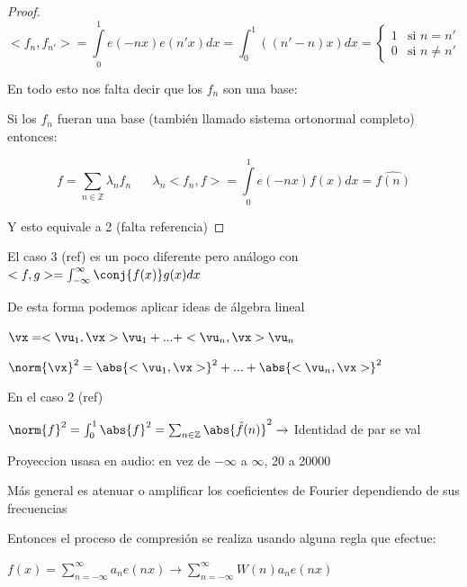 \begin{proof}

	$$< f_n, f_{n'}> = \int\limits^1_0 e(-nx) e(n'x) dx = \int^1_0 ((n' -n)x) dx =
	\begin{cases}
		1 & \mbox{si } n = n' \\
		0 & \mbox{si } n\neq n'
	\end{cases}$$

	En todo esto nos falta decir que los $f_n$ son una base:

	Si los $f_n$ fueran una base (también llamado sistema ortonormal completo) entonces:

	$$f = \sum_{n \in \mathbb{Z}} \lambda_n f_n \;\;\;\;\;\; \lambda_n <f_n, f> = \int\limits^{1}_0 e(-nx) f(x) dx = \hat{f(n)}$$

	Y esto equivale a 2 (falta referencia)

\end{proof}

\begin{prop}

	El caso 3 (ref) es un poco diferente pero análogo con $<f,g> = \int^{\infty}_{-\infty} \conj{f(x)} g(x) dx$

\end{prop}

\begin{corol}
	De esta forma podemos aplicar ideas de álgebra lineal

	$\vx = <\vu_1, \vx>\vu_1 + ... + <\vu_n, \vx>\vu_n$

	$\norm{\vx}^2 = \abs{<\vu_1, \vx>}^2 + ... + \abs{<\vu_n, \vx>}^2$

	En el caso 2 (ref)

	$\norm{f}^2 = \int^1_0 \abs{f}^2 = \sum_{n \in \mathbb{Z}} \abs{\hat{f}(n)}^2 \rightarrow$ Identidad de par se val


\end{corol}







Proyeccion usasa en audio: en vez de $-\infty$ a $\infty$, 20 a 20000

Más general es atenuar o amplificar los coeficientes de Fourier dependiendo de sus frecuencias

Entonces el proceso de compresión se realiza usando alguna regla que efectue:

$f(x) = \sum\limits^{\infty}_{n = -\infty} a_n e(nx) \rightarrow \sum\limits^{\infty}_{n = - \infty} W(n) a_n e(nx)$

